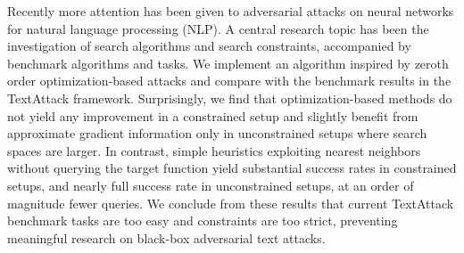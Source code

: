 Recently more attention has been given to adversarial attacks on neural networks for natural language processing (NLP). A central research topic has been the investigation of search algorithms and search constraints, accompanied by benchmark algorithms and tasks. We implement an algorithm inspired by zeroth order optimization-based attacks and compare with the benchmark results in the TextAttack framework. Surprisingly, we find that optimization-based methods do not yield any improvement in a constrained setup and slightly benefit from approximate gradient information only in unconstrained setups where search spaces are larger. In contrast, simple heuristics exploiting nearest neighbors without querying the target function yield substantial success rates in constrained setups, and nearly full success rate in unconstrained setups, at an order of magnitude fewer queries. We conclude from these results that current TextAttack benchmark tasks are too easy and constraints are too strict, preventing meaningful research on black-box adversarial text attacks.
